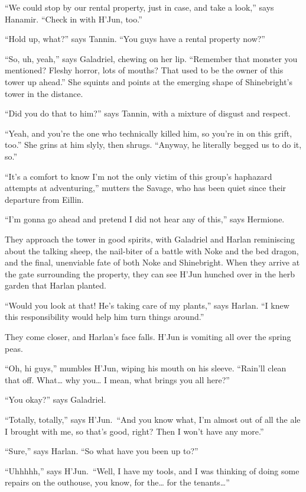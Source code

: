 \documentclass[smalldemyvopaper,11pt,twoside,onecolumn,openright,extrafontsizes]{memoir}
\begin{document}
``We could stop by our rental property, just in case, and take a look,''
says Hanamir. ``Check in with H'Jun, too.''

``Hold up, what?'' says Tannin. ``You guys have a rental property now?''

``So, uh, yeah,'' says Galadriel, chewing on her lip. ``Remember that
monster you mentioned? Fleshy horror, lots of mouths? That used to be
the owner of this tower up ahead.'' She squints and points at the
emerging shape of Shinebright's tower in the distance.

``Did you do that to him?'' says Tannin, with a mixture of disgust and
respect.

``Yeah, and you're the one who technically killed him, so you're in on
this grift, too.'' She grins at him slyly, then shrugs. ``Anyway, he
literally begged us to do it, so.''

``It's a comfort to know I'm not the only victim of this group's
haphazard attempts at adventuring,'' mutters the Savage, who has been
quiet since their departure from Eillin.

``I'm gonna go ahead and pretend I did not hear any of this,'' says
Hermione.

They approach the tower in good spirits, with Galadriel and Harlan
reminiscing about the talking sheep, the nail-biter of a battle with
Noke and the bed dragon, and the final, unenviable fate of both Noke and
Shinebright. When they arrive at the gate surrounding the property, they
can see H'Jun hunched over in the herb garden that Harlan planted.

``Would you look at that! He's taking care of my plants,'' says Harlan.
``I knew this responsibility would help him turn things around.''

They come closer, and Harlan's face falls. H'Jun is vomiting all over
the spring peas.

``Oh, hi guys,'' mumbles H'Jun, wiping his mouth on his sleeve.
``Rain'll clean that off. What\ldots{} why you\ldots{} I mean, what
brings you all here?''

``You okay?'' says Galadriel.

``Totally, totally,'' says H'Jun.~``And you know what, I'm almost out of
all the ale I brought with me, so that's good, right? Then I won't have
any more.''

``Sure,'' says Harlan. ``So what have you been up to?''

``Uhhhhh,'' says H'Jun.~``Well, I have my tools, and I was thinking of
doing some repairs on the outhouse, you know, for the\ldots{} for the
tenants\ldots{}''
\end{document}
